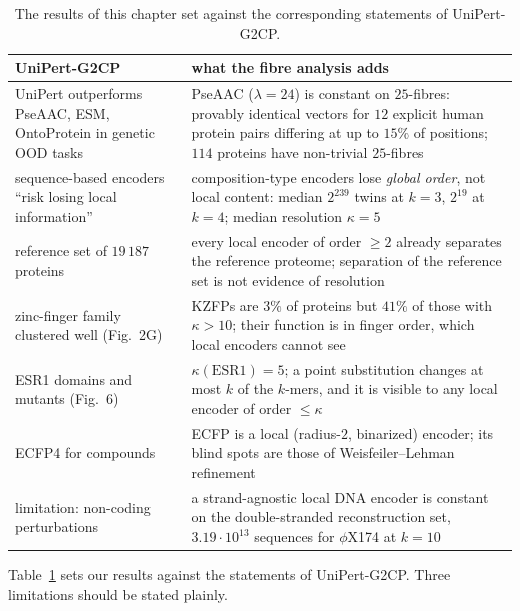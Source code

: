 \begin{table}[t]
\centering\small
\renewcommand{\arraystretch}{1.25}
\begin{tabular}{>{\raggedright\arraybackslash}p{}>{\raggedright\arraybackslash}p{}}
\toprule
UniPert-G2CP & what the fibre analysis adds\\
\midrule
UniPert outperforms PseAAC, ESM, OntoProtein in genetic OOD tasks & PseAAC ($\lambda=24$) is constant on
$25$-fibres: provably identical vectors for $12$ explicit human protein pairs differing at up to $15\%$
of positions; $114$ proteins have non-trivial $25$-fibres\\
sequence-based encoders ``risk losing local information'' & composition-type encoders lose
\emph{global order}, not local content: median $2^{239}$ twins at $k=3$, $2^{19}$ at $k=4$; median
resolution $\kappa=5$\\
reference set of $19\,187$ proteins & every local encoder of order $\ge2$ already separates the reference
proteome; separation of the reference set is not evidence of resolution\\
zinc-finger family clustered well (Fig.~2G) & KZFPs are $3\%$ of proteins but $41\%$ of those with
$\kappa>10$; their function is in finger order, which local encoders cannot see\\
ESR1 domains and mutants (Fig.~6) & $\kappa(\mathrm{ESR1})=5$; a point substitution changes at most $k$
of the $k$-mers, and it is visible to any local encoder of order $\le\kappa$\\
ECFP4 for compounds & ECFP is a local (radius-$2$, binarized) encoder; its blind spots are those of
Weisfeiler--Lehman refinement\\
limitation: non-coding perturbations & a strand-agnostic local DNA encoder is constant on the
double-stranded reconstruction set, $3.19\cdot10^{13}$ sequences for $\phi$X174 at $k=10$\\
\bottomrule
\end{tabular}
\caption{The results of this chapter set against the corresponding statements of UniPert-G2CP.}\label{ch12:tab:vs}
\end{table}

Table~\ref{ch12:tab:vs} sets our results against the statements of UniPert-G2CP. Three limitations
should be stated plainly.


